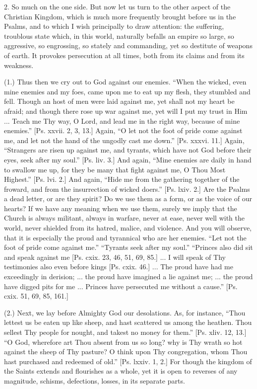 2. So much on the one side. But now let us turn to the other aspect
of the Christian Kingdom, which is much more frequently brought before
us in the Psalms, and to which I wish principally to draw attention:
the suffering, troublous state which, in this world, naturally befalls
an empire so large, so aggressive, so engrossing, so stately and
commanding, yet so destitute of weapons of earth. It provokes
persecution at all times, both from its claims and from its weakness.

(1.) Thus then we cry out to God against our enemies. ``When
the wicked, even mine enemies and my foes, came upon me to eat up my
flesh, they stumbled and fell. Though an host of men were laid against
me, yet shall not my heart be afraid; and though there rose up war
against me, yet will I put my trust in Him ... Teach me Thy way, O
Lord, and lead me in the right way, because of mine enemies.''
[Ps. xxvii. 2, 3, 13.] Again, ``O let not the foot of pride come
against me, and let not the hand of the ungodly cast me down.''
[Ps. xxxvi. 11.] Again, ``Strangers are risen up against me, and
tyrants, which have not God before their eyes, seek after my
soul.'' [Ps. liv. 3.] And again, ``Mine enemies are daily in
hand to swallow me up, for they be many that fight against me, O Thou
Most Highest.'' [Ps. lvi. 2.] And again, ``Hide me from the
gathering together of the froward, and from the insurrection of wicked
doers.'' [Ps. lxiv. 2.] Are the Psalms a dead letter, or are they
spirit? Do we use them as a form, or as the voice of our hearts? If we
have any meaning when we use them, surely we imply that the Church is
always militant, always in warfare, never at ease, never well with the
world, never shielded from its hatred, malice, and violence. And you
will observe, that it is especially the proud and tyrannical who are
her enemies. ``Let not the foot of pride come against me.''
``Tyrants seek after my soul.'' ``Princes also did sit and
speak against me [Ps. cxix. 23, 46, 51, 69, 85.] ... I will speak of
Thy testimonies also even before kings [Ps. cxix. 46.] ... The proud
have had me exceedingly in derision; ... the proud have imagined a lie
against me; ... the proud have digged pits for me ... Princes have
persecuted me without a cause.'' [Ps. cxix. 51, 69, 85, 161.]

(2.) Next, we lay before Almighty God our desolations. As, for
instance, ``Thou lettest us be eaten up like sheep, and hast
scattered us among the heathen. Thou sellest Thy people for nought,
and takest no money for them.'' [Ps. xliv. 12, 13.] ``O God,
wherefore art Thou absent from us so long? why is Thy wrath so hot
against the sheep of Thy pasture? O think upon Thy congregation, whom
Thou hast purchased and redeemed of old.'' [Ps. lxxiv. 1, 2.] For
though the kingdom of the Saints extends and flourishes as a whole,
yet it is open to reverses of any magnitude, schisms, defections,
losses, in its separate parts.

